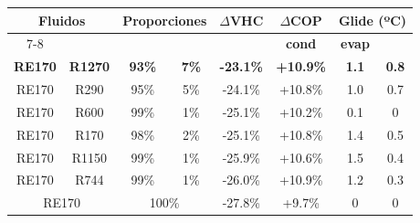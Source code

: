 
\begin{tabular}{|cc|cc|c|c|cc|}
\hline
\multicolumn{2}{|c|}{\multirow{2}{*}{\textbf{Fluidos}}} & \multicolumn{2}{c|}{\multirow{2}{*}{\textbf{Proporciones}}} & \multirow{2}{*}{\textbf{$\Delta$VHC}} & \multirow{2}{*}{\textbf{$\Delta$COP}} & \multicolumn{2}{c|}{\textbf{Glide (ºC)}} \\ \cline{7-8} 
\multicolumn{2}{|c|}{} & \multicolumn{2}{c|}{} &  &  & \multicolumn{1}{c|}{\textbf{cond}} & \textbf{evap} \\ \hline
\multicolumn{1}{|c|}{\textbf{RE170}} & \textbf{R1270} & \multicolumn{1}{c|}{\textbf{93\%}} & \textbf{7\%} & \textbf{-23.1\%} & \textbf{+10.9\%} & \multicolumn{1}{c|}{\textbf{1.1}} & \textbf{0.8} \\ \hline
\multicolumn{1}{|c|}{RE170} & R290 & \multicolumn{1}{c|}{95\%} & 5\% & -24.1\% & +10.8\% & \multicolumn{1}{c|}{1.0} & 0.7 \\ \hline
\multicolumn{1}{|c|}{RE170} & R600 & \multicolumn{1}{c|}{99\%} & 1\% & -25.1\% & +10.2\% & \multicolumn{1}{c|}{0.1} & 0 \\ \hline
\multicolumn{1}{|c|}{RE170} & R170 & \multicolumn{1}{c|}{98\%} & 2\% & -25.1\% & +10.8\% & \multicolumn{1}{c|}{1.4} & 0.5 \\ \hline
\multicolumn{1}{|c|}{RE170} & R1150 & \multicolumn{1}{c|}{99\%} & 1\% & -25.9\% & +10.6\% & \multicolumn{1}{c|}{1.5} & 0.4 \\ \hline
\multicolumn{1}{|c|}{RE170} & R744 & \multicolumn{1}{c|}{99\%} & 1\% & -26.0\% & +10.9\% & \multicolumn{1}{c|}{1.2} & 0.3 \\ \hline
\multicolumn{2}{|c|}{RE170} & \multicolumn{2}{c|}{100\%} & -27.8\% & +9.7\% & \multicolumn{1}{c|}{0} & 0 \\ \hline
\end{tabular}
